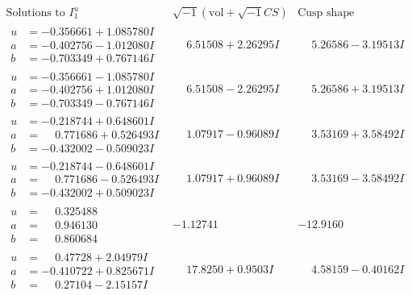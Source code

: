 \documentclass[1p]{elsarticle_modified}
\theoremstyle{definition}
\newcommand{\I}{\sqrt{-1}}
\begin{document}
$$\begin{array}{c|c|c}  
\text{Solutions to }I^u_{1}& \I (\text{vol} + \sqrt{-1}CS) & \text{Cusp shape}\\
 \hline 
\begin{aligned}
u &= -0.356661 + 1.085780 I \\
a &= -0.402756 - 1.012080 I \\
b &= -0.703349 + 0.767146 I\end{aligned}
 & \phantom{-}6.51508 + 2.26295 I & \phantom{-}5.26586 - 3.19513 I \\ \hline\begin{aligned}
u &= -0.356661 - 1.085780 I \\
a &= -0.402756 + 1.012080 I \\
b &= -0.703349 - 0.767146 I\end{aligned}
 & \phantom{-}6.51508 - 2.26295 I & \phantom{-}5.26586 + 3.19513 I \\ \hline\begin{aligned}
u &= -0.218744 + 0.648601 I \\
a &= \phantom{-}0.771686 + 0.526493 I \\
b &= -0.432002 - 0.509023 I\end{aligned}
 & \phantom{-}1.07917 - 0.96089 I & \phantom{-}3.53169 + 3.58492 I \\ \hline\begin{aligned}
u &= -0.218744 - 0.648601 I \\
a &= \phantom{-}0.771686 - 0.526493 I \\
b &= -0.432002 + 0.509023 I\end{aligned}
 & \phantom{-}1.07917 + 0.96089 I & \phantom{-}3.53169 - 3.58492 I \\ \hline\begin{aligned}
u &= \phantom{-}0.325488\phantom{ +0.000000I} \\
a &= \phantom{-}0.946130\phantom{ +0.000000I} \\
b &= \phantom{-}0.860684\phantom{ +0.000000I}\end{aligned}
 & -1.12741\phantom{ +0.000000I} & -12.9160\phantom{ +0.000000I} \\ \hline\begin{aligned}
u &= \phantom{-}0.47728 + 2.04979 I \\
a &= -0.410722 + 0.825671 I \\
b &= \phantom{-}0.27104 - 2.15157 I\end{aligned}
 & \phantom{-}17.8250 + 0.9503 I & \phantom{-}4.58159 - 0.40162 I \\ \hline\begin{aligned}

\end{aligned}
\end{array}$$
\end{document}
